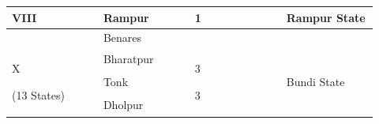 \par\medskip
\begin{longtable}{|p{0.23\linewidth}|p{0.23\linewidth}|p{0.23\linewidth}|p{0.23\linewidth}|}
\hline
\multirow{2}{*}{VIII



} & Rampur

 & \multirow{2}{*}{

1

} & \multirow{2}{*}{

Rampur State

} \\
\hline
 & Benares

 \\
\hline
\multirow{12}{*}{X









(13 States)











} & Bharatpur

 & \multirow{13}{*}{





3



3















} & \multirow{13}{*}{









Bundi State















} \\
\hline
 & Tonk

 \\
\hline
 & Dholpur


\end{longtable}
